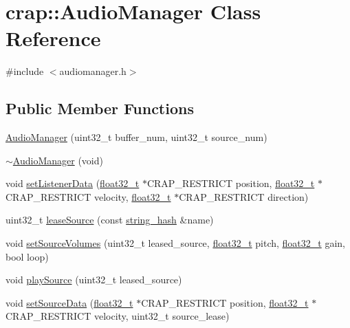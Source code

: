 \hypertarget{classcrap_1_1_audio_manager}{}\section{crap\+:\+:Audio\+Manager Class Reference}
\label{classcrap_1_1_audio_manager}


{\ttfamily \#include $<$audiomanager.\+h$>$}

\subsection*{Public Member Functions}
\begin{DoxyCompactItemize}
\item 
\hyperlink{classcrap_1_1_audio_manager_a446edb9c92c70f7667dad30d62cf74ac}{Audio\+Manager} (uint32\+\_\+t buffer\+\_\+num, uint32\+\_\+t source\+\_\+num)
\item 
\hyperlink{classcrap_1_1_audio_manager_a354d10d8577a6f3c9d8d121ef2c551dc}{$\sim$\+Audio\+Manager} (void)
\item 
void \hyperlink{classcrap_1_1_audio_manager_aaf4319fda2c8003de56fd7947b8a1363}{set\+Listener\+Data} (\hyperlink{crap__types_8h_a4611b605e45ab401f02cab15c5e38715}{float32\+\_\+t} $\ast$C\+R\+A\+P\+\_\+\+R\+E\+S\+T\+R\+I\+C\+T position, \hyperlink{crap__types_8h_a4611b605e45ab401f02cab15c5e38715}{float32\+\_\+t} $\ast$C\+R\+A\+P\+\_\+\+R\+E\+S\+T\+R\+I\+C\+T velocity, \hyperlink{crap__types_8h_a4611b605e45ab401f02cab15c5e38715}{float32\+\_\+t} $\ast$C\+R\+A\+P\+\_\+\+R\+E\+S\+T\+R\+I\+C\+T direction)
\item 
uint32\+\_\+t \hyperlink{classcrap_1_1_audio_manager_ac32b44b00640c4afaca9b77622889086}{lease\+Source} (const \hyperlink{classcrap_1_1string__hash}{string\+\_\+hash} \&name)
\item 
void \hyperlink{classcrap_1_1_audio_manager_a7f3ed79426556097ce33c3ca10ba2f65}{set\+Source\+Volumes} (uint32\+\_\+t leased\+\_\+source, \hyperlink{crap__types_8h_a4611b605e45ab401f02cab15c5e38715}{float32\+\_\+t} pitch, \hyperlink{crap__types_8h_a4611b605e45ab401f02cab15c5e38715}{float32\+\_\+t} gain, bool loop)
\item 
void \hyperlink{classcrap_1_1_audio_manager_a608671f0257d1db9204356ca25b69d76}{play\+Source} (uint32\+\_\+t leased\+\_\+source)
\item 
void \hyperlink{classcrap_1_1_audio_manager_ab4449ff51444a2f9ece308fa44fe8fbc}{set\+Source\+Data} (\hyperlink{crap__types_8h_a4611b605e45ab401f02cab15c5e38715}{float32\+\_\+t} $\ast$C\+R\+A\+P\+\_\+\+R\+E\+S\+T\+R\+I\+C\+T position, \hyperlink{crap__types_8h_a4611b605e45ab401f02cab15c5e38715}{float32\+\_\+t} $\ast$C\+R\+A\+P\+\_\+\+R\+E\+S\+T\+R\+I\+C\+T velocity, uint32\+\_\+t source\+\_\+lease)

\end{DoxyCompactItemize}
